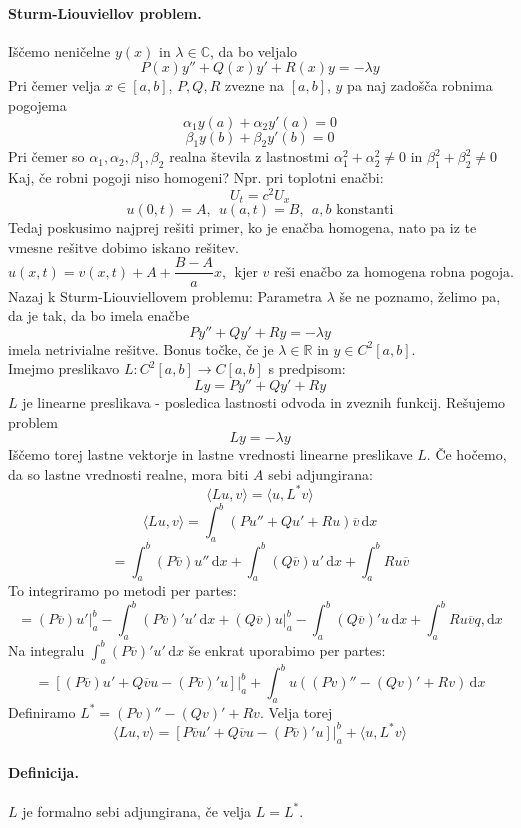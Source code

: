 \documentclass[a4paper]{article}
\newcommand{\dif}{\mathrm{d}}
\newcommand{\C}{\mathbb{C}}
\newcommand{\R}{\mathbb{R}}
\newcommand{\fn}[3]{{#1}\colon {#2} \rightarrow {#3}}
\newcommand{\avg}[1]{\langle {#1} \rangle}
\begin{document}
\paragraph{Sturm-Liouviellov problem.} Iščemo neničelne $y(x)$ in $\lambda \in \C$, da bo veljalo
$$P(x) y'' + Q(x)y' + R(x)y = -\lambda y$$
Pri čemer velja $x \in [a, b]$, $P, Q, R$ zvezne na $[a, b]$, $y$ pa naj zadošča robnima pogojema
$$\alpha_1 y(a) + \alpha_2 y'(a) = 0$$
$$\beta_1 y(b) + \beta_2 y'(b) = 0$$
Pri čemer so $\alpha_1, \alpha_2, \beta_1, \beta_2$ realna števila z lastnostmi $\alpha_1^2 + \alpha_2^2 \neq 0$ in
$\beta_1^2 + \beta_2^2 \neq 0$ \\
Kaj, če robni pogoji niso homogeni? Npr. pri toplotni enačbi:
$$U_t = c^2 U_x$$
$$u(0, t) = A, ~~ u(a, t) = B,~~a, b \text{ konstanti}$$
Tedaj poskusimo najprej rešiti primer, ko je enačba homogena, nato pa iz te vmesne rešitve dobimo iskano rešitev.
$$u(x, t) = v(x, t) + A + \frac{B-A}{a}x,~~\text{kjer $v$ reši enačbo za homogena robna pogoja.}$$
Nazaj k Sturm-Liouviellovem problemu: Parametra $\lambda$ še ne poznamo, želimo pa, da je tak, da bo imela enačbe $$Py'' + Qy' + Ry = -\lambda y$$
imela netrivialne rešitve. Bonus točke, če je $\lambda \in \R$ in $y \in C^2[a, b]$. \\
Imejmo preslikavo $\fn{L}{C^2[a, b]}{C[a, b]}$ s predpisom:
$$Ly  = Py'' + Qy' + Ry$$
$L$ je linearne preslikava - posledica lastnosti odvoda in zveznih funkcij. Rešujemo problem
$$Ly = -\lambda y$$
Iščemo torej lastne vektorje in lastne vrednosti linearne preslikave $L$. Če hočemo, da so lastne vrednosti realne, mora biti $A$ sebi adjungirana:
$$\avg{Lu, v} = \avg{u, L^*v}$$
$$\avg{Lu, v} = \int_{a}^{b}\left(Pu'' + Qu' + Ru\right)\overline{v}\,\dif x$$
$$= \int_{a}^{b} (P\overline{v})u'' \,\dif x + \int_{a}^{b} (Q\overline{v})u'\,\dif x + \int_{a}^{b}Ru\overline{v}$$
To integriramo po metodi per partes:
$$= (P\overline{v})u'\Big|_a^b - \int_{a}^{b}(P\overline{v})'u'\,\dif x + (Q\overline{v})u\Big|_a^b - \int_{a}^{b}(Q\overline{v})'u\,\dif x + \int_{a}^{b}Ru\overline{v}q,\dif x$$
Na integralu $\displaystyle{\int_{a}^{b} (P\overline{v})'u'\,\dif x}$ še enkrat uporabimo per partes:
$$= \left[(P\overline{v})u' + Q\overline{v}u - (P\overline{v})'u\right]\Big|_a^b + \int_{a}^{b} u\left((Pv)'' - (Qv)' + Rv\right)\,\dif x$$
Definiramo $L^* = (Pv)'' - (Qv)' + Rv$. Velja torej
$$\avg{Lu, v} = \left[P\overline{v}u' + Q\overline{v}u-(P\overline{v})'u\right]\Big|_{a}^{b} + \avg{u, L^*v}$$
\paragraph{Definicija.} $L$ je formalno sebi adjungirana, če velja $L = L^*$.
\end{document}
